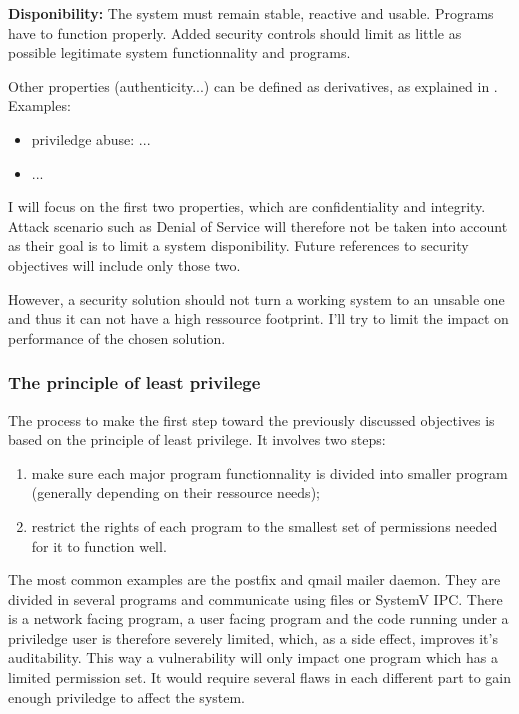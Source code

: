 \documentclass[pdftex,a4paper,titlepage,11pt]{article}
\begin{document}
\medskip

\textbf{Disponibility:}
The system must remain stable, reactive and usable. Programs have to function
properly. Added security controls should limit as little as possible legitimate
system functionnality and programs.

\bigskip

Other properties (authenticity...) can be defined as derivatives, as explained
in \cite{THESEBRIFFAUT}. Examples:
\begin{itemize}
	\item priviledge abuse: ...
	\item ... %
\end{itemize}

\smallskip

I will focus on the first two properties, which are confidentiality and
integrity. Attack scenario such as Denial of Service will therefore not be taken
into account as their goal is to limit a system disponibility. Future references
to security objectives will include only those two.

\bigskip

However, a security solution should not turn a working system to an unsable one
and thus it can not have a high ressource footprint. I'll try to limit the
impact on performance of the chosen solution.

\subsubsection{The principle of least privilege}

The process to make the first step toward the previously discussed objectives is
based on the principle of least privilege. It involves two steps:
\begin{enumerate}
	\item make sure each major program functionnality is divided into smaller
program (generally depending on their ressource needs);
	\item restrict the rights of each program to the smallest set of permissions
needed for it to function well.
\end{enumerate}

\smallskip

The most common examples are the postfix and qmail mailer daemon. They are
divided in several programs and communicate using files or SystemV IPC. There is
a network facing program, a user facing program and the code running under a
priviledge user is therefore severely limited, which, as a side effect, improves
it's auditability. This way a vulnerability will only impact one program which
has a limited permission set. It would require several flaws in each different
part to gain enough priviledge to affect the system.
\end{document}
